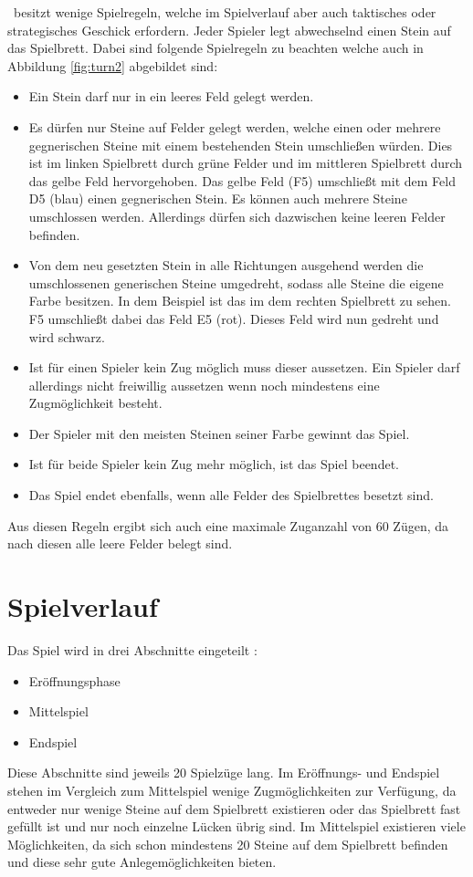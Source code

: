 \ot\ besitzt wenige Spielregeln, welche im Spielverlauf aber auch taktisches oder strategisches Geschick erfordern. Jeder Spieler legt abwechselnd einen Stein auf das Spielbrett. Dabei sind folgende Spielregeln zu beachten welche auch in Abbildung \ref{fig:turn2} abgebildet sind:
\begin{itemize}
\item Ein Stein darf nur in ein leeres Feld gelegt werden.
\item Es dürfen nur Steine auf Felder gelegt werden, welche einen oder mehrere gegnerischen Steine mit einem bestehenden Stein umschließen würden. Dies ist im linken Spielbrett durch grüne Felder und im mittleren Spielbrett durch das gelbe Feld hervorgehoben. Das gelbe Feld (F5) umschließt mit dem Feld D5 (blau) einen gegnerischen Stein. Es können auch mehrere Steine umschlossen werden. Allerdings dürfen sich dazwischen keine leeren Felder befinden.
\item Von dem neu gesetzten Stein in alle Richtungen ausgehend werden die umschlossenen generischen Steine umgedreht, sodass alle Steine die eigene Farbe besitzen. In dem Beispiel ist das im dem rechten Spielbrett zu sehen. F5 umschließt dabei das Feld E5 (rot). Dieses Feld wird nun gedreht und wird schwarz.
\item Ist für einen Spieler kein Zug möglich muss dieser aussetzen. Ein Spieler darf allerdings nicht freiwillig aussetzen wenn noch mindestens eine Zugmöglichkeit besteht.
\item Der Spieler mit den meisten Steinen seiner Farbe gewinnt das Spiel.
\item Ist für beide Spieler kein Zug mehr möglich, ist das Spiel beendet. 
\item Das Spiel endet ebenfalls, wenn alle Felder des Spielbrettes besetzt sind.
\end{itemize}
Aus diesen Regeln ergibt sich auch eine maximale Zuganzahl von 60 Zügen, da nach diesen alle leere Felder belegt sind.
\newpage
\section{Spielverlauf}
Das Spiel wird in drei Abschnitte eingeteilt \cite{Ortiz.}:
\begin{itemize}
\item Eröffnungsphase
\item Mittelspiel
\item Endspiel
\end{itemize}
Diese Abschnitte sind jeweils 20 Spielzüge lang.
Im Eröffnungs- und Endspiel stehen im Vergleich zum Mittelspiel wenige Zugmöglichkeiten zur Verfügung, da entweder nur wenige Steine auf dem Spielbrett existieren oder das Spielbrett fast gefüllt ist und nur noch einzelne Lücken übrig sind. Im Mittelspiel existieren viele Möglichkeiten, da sich schon mindestens 20 Steine auf dem Spielbrett befinden und diese sehr gute Anlegemöglichkeiten bieten. 
